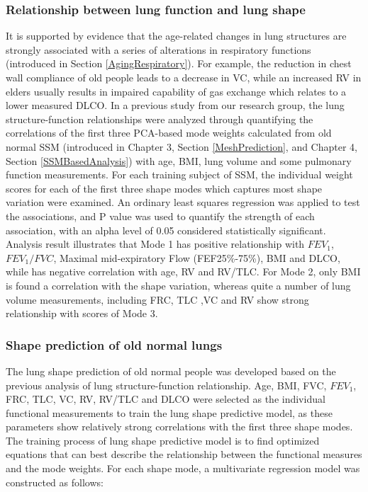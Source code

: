 \subsubsection{Relationship between lung function and lung shape}
It is supported by evidence that the age-related changes in lung structures are strongly associated with a series of alterations in respiratory functions (introduced in Section \ref{AgingRespiratory}). For example, the reduction in chest wall compliance of old people leads to a decrease in VC, while an increased RV in elders usually results in impaired capability of gas exchange which relates to a lower measured DLCO. In a previous study from our research group, the lung structure-function relationships were analyzed through quantifying the correlations of the first three PCA-based mode weights calculated from old normal SSM (introduced in Chapter 3, Section \ref{MeshPrediction}, and Chapter 4, Section \ref{SSMBasedAnalysis}) with age, BMI, lung volume and some pulmonary function measurements. For each training subject of SSM, the individual weight scores for each of the first three shape modes which captures most shape variation were examined. An ordinary least squares regression was applied to test the associations, and P value was used to quantify the strength of each association, with an alpha level of 0.05 considered statistically significant. Analysis result illustrates that Mode 1 has positive relationship with $FEV_1$, $FEV_1/FVC$, Maximal mid-expiratory Flow (FEF25\%-75\%), BMI and DLCO, while has negative correlation with age, RV and RV/TLC. For Mode 2, only BMI is found a correlation with the shape variation, whereas quite a number of lung volume measurements, including FRC, TLC ,VC and RV show strong relationship with scores of Mode 3.

\subsubsection{Shape prediction of old normal lungs}
The lung shape prediction of old normal people was developed based on the previous analysis of lung structure-function relationship. Age, BMI, FVC, $FEV_1$, FRC, TLC, VC, RV, RV/TLC and DLCO were selected as the individual functional measurements to train the lung shape predictive model, as these parameters show relatively strong correlations with the first three shape modes. The training process of lung shape predictive model is to find optimized equations that can best describe the relationship between the functional measures and the mode weights. For each shape mode, a multivariate regression model was constructed as follows:

